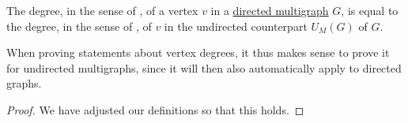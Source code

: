 \begin{proposition}\label{thm:degree_of_undirected_counterpart}
  The degree, in the sense of , of a vertex \( v \) in a \hyperref[def:directed_multigraph]{directed multigraph} \( G \), is equal to the degree, in the sense of , of \( v \) in the undirected counterpart \( \hyperref[def:graph_functors/multi_forgetful]{U_M}(G) \) of \( G \).
\end{proposition}
\begin{comments}
  \item When proving statements about vertex degrees, it thus makes sense to prove it for undirected multigraphs, since it will then also automatically apply to directed graphs.
\end{comments}
\begin{proof}
  We have adjusted our definitions so that this holds.
\end{proof}


